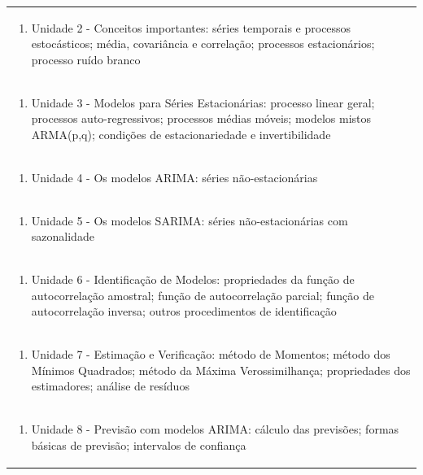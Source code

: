 \documentclass[11pt]{article}
\begin{document}
\begin{center}
\begin{longtable}{|p{4cm}|p{4cm}|p{4cm}|p{4cm}|}
\multicolumn{4}{|p{\dimexpr 16cm + 6\tabcolsep\relax}|}{\begin{enumerate}[start=2]\item Unidade 2 - Conceitos importantes: séries temporais e processos estocásticos; média, covariância e correlação; processos estacionários; processo ruído branco\end{enumerate}}\\
\multicolumn{4}{|p{\dimexpr 16cm + 6\tabcolsep\relax}|}{\begin{enumerate}[start=3]\item Unidade 3 - Modelos para Séries Estacionárias: processo linear geral; processos auto-regressivos; processos médias móveis; modelos mistos ARMA(p,q); condições de estacionariedade e invertibilidade\end{enumerate}}\\
\multicolumn{4}{|p{\dimexpr 16cm + 6\tabcolsep\relax}|}{\begin{enumerate}[start=4]\item Unidade 4 - Os modelos ARIMA: séries não-estacionárias\end{enumerate}}\\
\multicolumn{4}{|p{\dimexpr 16cm + 6\tabcolsep\relax}|}{\begin{enumerate}[start=5]\item Unidade 5 - Os modelos SARIMA: séries não-estacionárias com sazonalidade\end{enumerate}}\\
\multicolumn{4}{|p{\dimexpr 16cm + 6\tabcolsep\relax}|}{\begin{enumerate}[start=6]\item Unidade 6 - Identificação de Modelos: propriedades da função de autocorrelação amostral; função de autocorrelação parcial; função de autocorrelação inversa; outros procedimentos de identificação\end{enumerate}}\\
\multicolumn{4}{|p{\dimexpr 16cm + 6\tabcolsep\relax}|}{\begin{enumerate}[start=7]\item Unidade 7 - Estimação e Verificação: método de Momentos; método dos Mínimos Quadrados; método da Máxima Verossimilhança; propriedades dos estimadores; análise de resíduos\end{enumerate}}\\
\multicolumn{4}{|p{\dimexpr 16cm + 6\tabcolsep\relax}|}{\begin{enumerate}[start=8]\item Unidade 8 - Previsão com modelos ARIMA: cálculo das previsões; formas básicas de previsão; intervalos de confiança\end{enumerate}}\\

\end{longtable}
\end{center}
\end{document}
